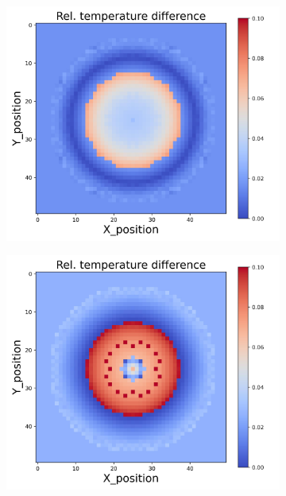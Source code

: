 \begin{figure}[h]
    \begin{minipage}{\textwidth}
        \centering
        \begin{subfigure}{0.3\textwidth}
            \centering
            \includegraphics[width=\textwidth]{figures/raw_data/22/linear/T_bias.jpg}
        \end{subfigure}
        \begin{subfigure}{0.3\textwidth}
            \centering
            \includegraphics[width=\textwidth]{figures/raw_data/23/linear/T_bias.jpg}

\end{subfigure}
\end{minipage}
\end{figure}
